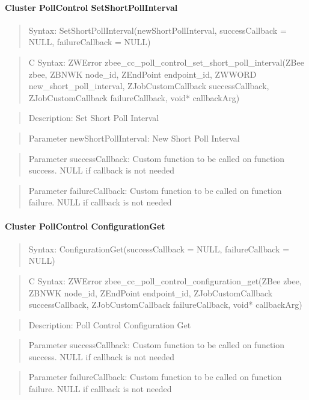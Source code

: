 \paragraph{Cluster PollControl SetShortPollInterval}
\begin{quote}Syntax: SetShortPollInterval(newShortPollInterval, successCallback = NULL, failureCallback = NULL)\end{quote}
\begin{quote}C Syntax: ZWError zbee\_cc\_poll\_control\_set\_short\_poll\_interval(ZBee zbee, ZBNWK node\_id, ZEndPoint endpoint\_id, ZWWORD new\_short\_poll\_interval, ZJobCustomCallback successCallback, ZJobCustomCallback failureCallback, void* callbackArg)\end{quote}
\begin{quote}Description: Set Short Poll Interval\end{quote}
\begin{quote}Parameter newShortPollInterval: New Short Poll Interval\end{quote}
\begin{quote}Parameter successCallback: Custom function to be called on function success. NULL if callback is not needed\end{quote}
\begin{quote}Parameter failureCallback: Custom function to be called on function failure. NULL if callback is not needed\end{quote}


\paragraph{Cluster PollControl ConfigurationGet}
\begin{quote}Syntax: ConfigurationGet(successCallback = NULL, failureCallback = NULL)\end{quote}
\begin{quote}C Syntax: ZWError zbee\_cc\_poll\_control\_configuration\_get(ZBee zbee, ZBNWK node\_id, ZEndPoint endpoint\_id, ZJobCustomCallback successCallback, ZJobCustomCallback failureCallback, void* callbackArg)\end{quote}
\begin{quote}Description: Poll Control Configuration Get\end{quote}
\begin{quote}Parameter successCallback: Custom function to be called on function success. NULL if callback is not needed\end{quote}
\begin{quote}Parameter failureCallback: Custom function to be called on function failure. NULL if callback is not needed\end{quote}



